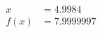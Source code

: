\documentclass[preview]{standalone}
\begin{document}
\begin{align*}
x &= 4.9984\\f(x) &= 7.9999997
\end{align*}
\end{document}
